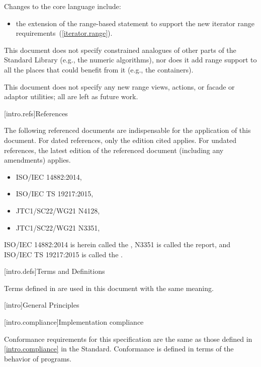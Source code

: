 \pnum
Changes to the core language include:

\begin{itemize}
\item the extension of the range-based  statement to support
the new iterator range requirements~(\ref{iterator.range}).
\end{itemize}

\pnum
This document does not specify constrained analogues of other parts of the Standard
Library (e.g., the numeric algorithms), nor does it add range support to all the
places that could benefit from it (e.g., the containers).

\pnum
This document does not specify any new range views, actions, or facade or adaptor
utilities; all are left as future work.

[intro.refs]{References}

\pnum
The following referenced documents are indispensable for the
application of this document. For dated references, only the
edition cited applies. For undated references, the latest edition
of the referenced document (including any amendments) applies.

\begin{itemize}
\item ISO/IEC 14882:2014, 
\item ISO/IEC TS 19217:2015, 
\item JTC1/SC22/WG21 N4128, 
\item JTC1/SC22/WG21 N3351, 
\end{itemize}

ISO/IEC 14882:2014 is herein called the , N3351 is called the
 report, and ISO/IEC TS 19217:2015 is called the .

[intro.defs]{Terms and Definitions}

\pnum
Terms defined in  are used in this document with the same
meaning.

[intro]{General Principles}

[intro.compliance]{Implementation compliance}

\pnum
Conformance requirements for this specification are the same as those
defined in \ref{intro.compliance} in the \Cpp Standard.
\enternote
Conformance is defined in terms of the behavior of programs.
\exitnote

